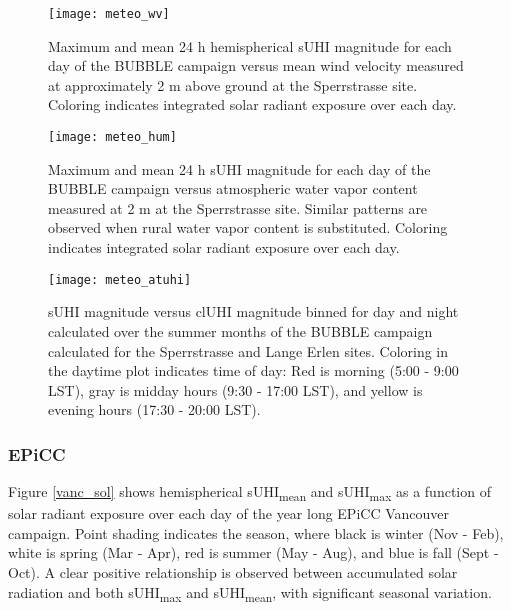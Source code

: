\begin{bibunit}
\begin{figure}[H]
	\centering
	\texttt{[image: meteo\_wv]}
	\caption{Maximum and mean 24 \si{\hour} hemispherical sUHI magnitude for each day of the BUBBLE campaign versus mean wind velocity measured at approximately 2 \si{\meter} above ground at the Sperrstrasse site. Coloring indicates integrated solar radiant exposure over each day.}
	\label{meteo_wv}
\end{figure}

\begin{figure}[H]
	\centering
	\texttt{[image: meteo\_hum]}
	\caption{Maximum and mean 24 \si{\hour} sUHI magnitude for each day of the BUBBLE campaign versus atmospheric water vapor content measured at 2 \si{\meter} at the Sperrstrasse site. Similar patterns are observed when rural water vapor content is substituted. Coloring indicates integrated solar radiant exposure over each day.}
	\label{meteo_hum}
\end{figure}

\begin{figure}[H]
	\centering
	\texttt{[image: meteo\_atuhi]}
	\caption{sUHI magnitude versus clUHI magnitude binned for day and night calculated over the summer months of the BUBBLE campaign calculated for the Sperrstrasse and Lange Erlen sites.  Coloring in the daytime plot indicates time of day: Red is morning (5:00 - 9:00 LST), gray is midday hours (9:30 - 17:00 LST), and yellow is evening hours (17:30 - 20:00 LST).}
	\label{meteo_atuhi}
\end{figure}

\subsubsection{EPiCC}

Figure \ref{vanc_sol} shows hemispherical sUHI\textsubscript{mean} and sUHI\textsubscript{max} as a function of solar radiant exposure over each day of the year long EPiCC Vancouver campaign. Point shading indicates the season, where black is winter (Nov - Feb), white is spring (Mar - Apr), red is summer (May - Aug), and blue is fall (Sept - Oct). A clear positive relationship is observed between accumulated solar radiation and both sUHI\textsubscript{max} and sUHI\textsubscript{mean}, with significant seasonal variation. 


\end{bibunit}

